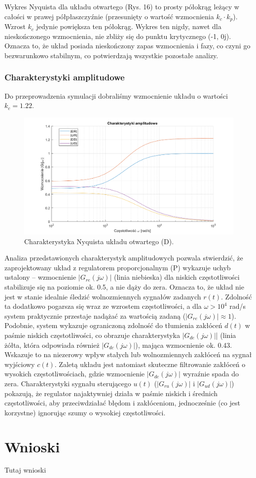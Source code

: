 \documentclass[12pt,a4paper]{article}
\begin{document}
	Wykres Nyquista dla układu otwartego (Rys. 16) to prosty półokrąg leżący w całości w prawej półpłaszczyźnie (przesunięty o wartość wzmocnienia $k_c \cdot k_p$). Wzrost $k_c$ jedynie powiększa ten półokrąg. Wykres ten nigdy, nawet dla nieskończonego wzmocnienia, nie zbliży się do punktu krytycznego (-1, 0j). Oznacza to, że układ posiada nieskończony zapas wzmocnienia i fazy, co czyni go bezwarunkowo stabilnym, co potwierdzają wszystkie pozostałe analizy.
	
	\subsubsection{Charakterystyki amplitudowe}
		
		Do przeprowadzenia symulacji dobraliśmy wzmocnienie układu o wartości $k_c = 1.22$.
				
		\begin{figure}[H]
			\centering
			\includegraphics[width=0.8\linewidth]{zdjecia/char_czest_ukladu_D.png}
			\caption{Charakterystyka Nyquista układu otwartego (D).}
			\label{fig:char_czest_ukladu_D}
		\end{figure}
		
		Analiza przedstawionych charakterystyk amplitudowych pozwala stwierdzić, że zaprojektowany układ z regulatorem proporcjonalnym (P) wykazuje uchyb ustalony – wzmocnienie $|G_{re}(j\omega)|$ (linia niebieska) dla niskich częstotliwości stabilizuje się na poziomie ok. 0.5, a nie dąży do zera. Oznacza to, że układ nie jest w stanie idealnie śledzić wolnozmiennych sygnałów zadanych $r(t)$. Zdolność ta dodatkowo pogarsza się wraz ze wzrostem częstotliwości, a dla $\omega > 10^4$ rad/s system praktycznie przestaje nadążać za wartością zadaną ($|G_{re}(j\omega)| \approx 1$). Podobnie, system wykazuje ograniczoną zdolność do tłumienia zakłóceń $d(t)$ w paśmie niskich częstotliwości, co obrazuje charakterystyka $|G_{de}(j\omega)|$| (linia żółta, która odpowiada również $|G_{dc}(j\omega)|$), mająca wzmocnienie ok. 0.43. Wskazuje to na niezerowy wpływ stałych lub wolnozmiennych zakłóceń na sygnał wyjściowy $c(t)$. Zaletą układu jest natomiast skuteczne filtrowanie zakłóceń o wysokich częstotliwościach, gdzie wzmocnienie $|G_{de}(j\omega)|$ wyraźnie spada do zera. Charakterystyki sygnału sterującego $u(t)$ ($|G_{ru}(j\omega)|$ i $|G_{ud}(j\omega)|$) pokazują, że regulator najaktywniej działa w paśmie niskich i średnich częstotliwości, aby przeciwdziałać błędom i zakłóceniom, jednocześnie (co jest korzystne) ignorując szumy o wysokiej częstotliwości.
			
	\section{Wnioski}
	Tutaj wnioski
	
\end{document}
